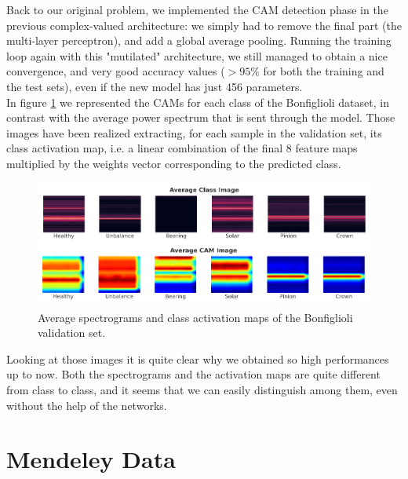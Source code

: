 \documentclass[../main.tex]{subfiles}
\begin{document}
Back to our original problem, we implemented the CAM detection phase in the previous complex-valued architecture: we simply had to remove the final part (the multi-layer perceptron), and add a global average pooling. Running the training loop again with this "mutilated" architecture, we still managed to obtain a nice convergence, and very good accuracy values ($>95\%$ for both the training and the test sets), even if the new model has just 456 parameters.\\
In figure \ref{fig:bonfiglioli_CAM_images} we represented the CAMs for each class of the Bonfiglioli dataset, in contrast with the average power spectrum that is sent through the model. Those images have been realized extracting, for each sample in the validation set, its class activation map, i.e. a linear combination of the final 8 feature maps multiplied by the weights vector corresponding to the predicted class. 
\begin{figure}[ht]
	\centering
	\includegraphics[width=\textwidth]{pictures/bonfiglioli_CAM_images}
	\caption{Average spectrograms and class activation maps of the Bonfiglioli validation set.}
	\label{fig:bonfiglioli_CAM_images}	
\end{figure}

Looking at those images it is quite clear why we obtained so high performances up to now. Both the spectrograms and the activation maps are quite different from class to class, and it seems that we can easily distinguish among them, even without the help of the networks.

\section{Mendeley Data}
\label{sec:mendeley_analysis}
\end{document}
